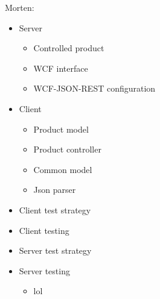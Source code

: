 Morten: 
\begin{itemize}
	\item Server
	\begin{itemize}
		\item Controlled product
		\item WCF interface
		\item WCF-JSON-REST configuration
	\end{itemize}
	\item Client
	\begin{itemize}
		\item Product model
		\item Product controller
		\item Common model
		\item Json parser
	\end{itemize}
	\item Client test strategy
	\item Client testing
	\item Server test strategy
	\item Server testing
	\begin{itemize}
		\item lol
	\end{itemize}
\end{itemize}